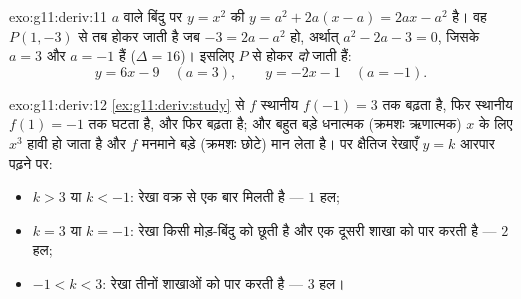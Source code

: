 \begin{solution}{exo:g11:deriv:11}
 $a$ वाले बिंदु पर $y = x^2$ की  $y = a^2 + 2a(x - a) = 2ax - a^2$ है। वह $P(1, -3)$ से तब होकर
जाती है जब $-3 = 2a - a^2$ हो, अर्थात् $a^2 - 2a - 3 = 0$, जिसके  $a = 3$ और $a = -1$ हैं ($\Delta = 16$)।
इसलिए $P$ से होकर \emph{दो}  जाती हैं:
\[
y = 6x - 9 \quad (a = 3),
\qquad
y = -2x - 1 \quad (a = -1).
\]
\end{solution}

\begin{solution}{exo:g11:deriv:12}
\cref{ex:g11:deriv:study} से $f$ स्थानीय  $f(-1) = 3$ तक बढ़ता है, फिर स्थानीय  $f(1) = -1$
तक घटता है, और फिर बढ़ता है; और बहुत बड़े धनात्मक (क्रमशः ऋणात्मक) $x$ के
लिए $x^3$ हावी हो जाता है और $f$ मनमाने बड़े (क्रमशः छोटे) मान लेता है।
 पर क्षैतिज रेखाएँ $y = k$ आरपार पढ़ने पर:
\begin{itemize}
  \item $k > 3$ या $k < -1$: रेखा वक्र से एक बार मिलती है --- $1$ हल;
  \item $k = 3$ या $k = -1$: रेखा किसी मोड़-बिंदु को छूती है और एक दूसरी शाखा
        को पार करती है --- $2$ हल;
  \item $-1 < k < 3$: रेखा तीनों शाखाओं को पार करती है --- $3$ हल।
\end{itemize}
\end{solution}

